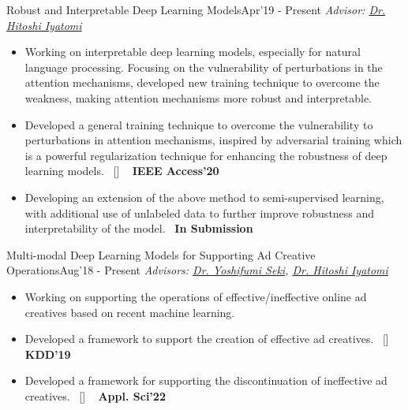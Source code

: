 \begin{projects}

\project
	{Robust and Interpretable Deep Learning Models}{Apr'19 - Present}
	{
	    \textit{Advisor:  \href{https://iyatomi-lab.info/english/people/2013-6-8}{Dr. Hitoshi Iyatomi}}
	}
	{\begin{itemize}
	\setlength\itemsep{0.3em}
     \item Working on interpretable deep learning models, especially for natural language processing. Focusing on the vulnerability of perturbations in the attention mechanisms, developed new training technique to overcome the weakness, making attention mechanisms more robust and interpretable.
     \item Developed a general training technique to overcome the vulnerability to perturbations in attention mechanisms, inspired by adversarial training which is a powerful regularization technique for enhancing the robustness of deep learning models.~ [\href{http://shunk031.github.io/attention-meets-perturbation/}{\small{\websiteSymbol}}] ~ {\small{\lbrack\textbf{{IEEE Access'20}}\rbrack}}
     \item Developing an extension of the above method to semi-supervised learning, with additional use of unlabeled data to further improve robustness and interpretability of the model.~ {\small{\lbrack\textbf{{In Submission}}\rbrack}}
     \end{itemize}}

\project
	{Multi-modal Deep Learning Models for Supporting Ad Creative Operations}{Aug'18 - Present}
	{
	    \textit{Advisors:  \href{https://scholar.google.com/citations?user=LoZ7VeYAAAAJ}{Dr. Yoshifumi Seki}, \href{https://iyatomi-lab.info/english/people/2013-6-8}{Dr. Hitoshi Iyatomi}}
	}
	{\begin{itemize}
	\setlength\itemsep{0.3em}
     \item Working on supporting the operations of effective/ineffective online ad creatives based on recent machine learning.
     \item Developed a framework to support the creation of effective ad creatives.~ [\href{https://github.com/shunk031/Multi-task-Conditional-Attention-Networks}{\small{\githubSymbol}}] ~ {\small{\lbrack\textbf{{KDD'19}}\rbrack}}
     \item Developed a framework for supporting the discontinuation of ineffective ad creatives.~ [\href{https://www.mdpi.com/2076-3417/12/7/3594}{\small{\websiteSymbol}}] ~ {\small{\lbrack\textbf{{Appl. Sci'22}}\rbrack}}
     \end{itemize}}


\end{projects}
